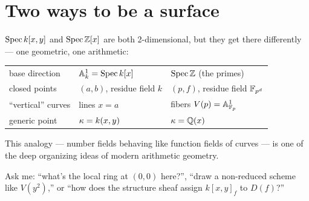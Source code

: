 \section{Two ways to be a surface}

$\operatorname{Spec} k[x,y]$ and $\operatorname{Spec}\mathbb{Z}[x]$ are both 2-dimensional, but they get there differently ---
one geometric, one arithmetic:

\begin{center}
\begin{tabular}{@{}L{2.6cm}L{4.6cm}L{4.6cm}@{}}
\toprule
 &  &  \\
\midrule
base direction & $\mathbb{A}^1_k=\operatorname{Spec} k[x]$ & $\operatorname{Spec}\mathbb{Z}$ (the primes) \\
closed points & $(a,b)$, residue field $k$ & $(p,f)$, residue field $\mathbb{F}_{p^d}$ \\
``vertical'' curves & lines $x=a$ & fibers $V(p)=\mathbb{A}^1_{\mathbb{F}_p}$ \\
generic point & $\kappa=k(x,y)$ & $\kappa=\mathbb{Q}(x)$ \\
\bottomrule
\end{tabular}
\end{center}

This analogy --- number fields behaving like function fields of curves --- is one of the deep
organizing ideas of modern arithmetic geometry.

\begin{intubox}
Ask me: ``what's the local ring at $(0,0)$ here?'', ``draw a non-reduced scheme like $V(y^2)$,''
or ``how does the structure sheaf assign $k[x,y]_f$ to $D(f)$?''
\end{intubox}
